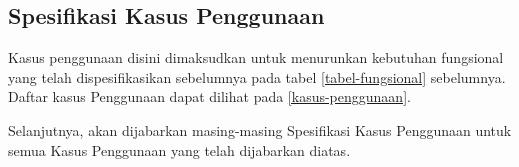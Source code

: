 \subsection{Spesifikasi Kasus Penggunaan}
	Kasus penggunaan disini dimaksudkan untuk menurunkan kebutuhan fungsional yang telah dispesifikasikan sebelumnya pada tabel \ref{tabel-fungsional} sebelumnya.\\
	Daftar kasus Penggunaan dapat dilihat pada \ref{kasus-penggunaan}.
	
	
	Selanjutnya, akan dijabarkan masing-masing Spesifikasi Kasus Penggunaan untuk semua  Kasus Penggunaan yang telah dijabarkan diatas.
	
	
	
	
	
	
	
	
	
	
	
	







